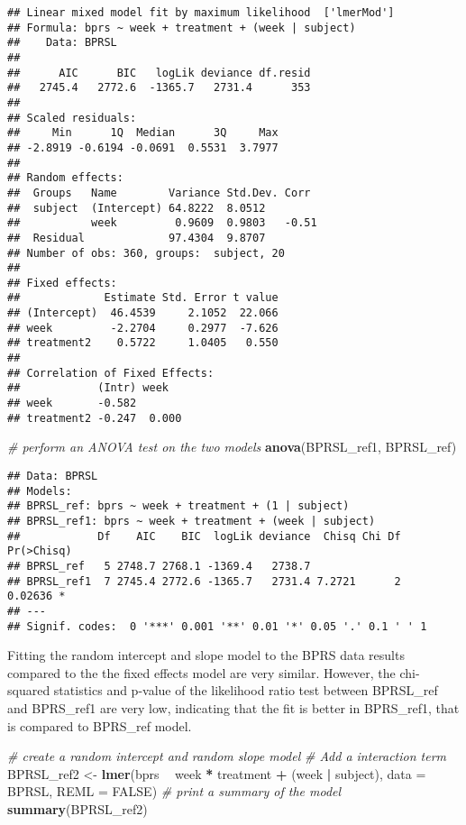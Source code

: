 \documentclass[]{article}
\newenvironment{Shaded}{\begin{snugshade}}{\end{snugshade}}
\newcommand{\CommentTok}[1]{\textcolor[rgb]{0.56,0.35,0.01}{\textit{#1}}}
\newcommand{\DataTypeTok}[1]{\textcolor[rgb]{0.13,0.29,0.53}{#1}}
\newcommand{\KeywordTok}[1]{\textcolor[rgb]{0.13,0.29,0.53}{\textbf{#1}}}
\newcommand{\NormalTok}[1]{#1}
\newcommand{\OperatorTok}[1]{\textcolor[rgb]{0.81,0.36,0.00}{\textbf{#1}}}
\newcommand{\OtherTok}[1]{\textcolor[rgb]{0.56,0.35,0.01}{#1}}
\newcommand{\StringTok}[1]{\textcolor[rgb]{0.31,0.60,0.02}{#1}}
\begin{document}
\begin{verbatim}
## Linear mixed model fit by maximum likelihood  ['lmerMod']
## Formula: bprs ~ week + treatment + (week | subject)
##    Data: BPRSL
## 
##      AIC      BIC   logLik deviance df.resid 
##   2745.4   2772.6  -1365.7   2731.4      353 
## 
## Scaled residuals: 
##     Min      1Q  Median      3Q     Max 
## -2.8919 -0.6194 -0.0691  0.5531  3.7977 
## 
## Random effects:
##  Groups   Name        Variance Std.Dev. Corr 
##  subject  (Intercept) 64.8222  8.0512        
##           week         0.9609  0.9803   -0.51
##  Residual             97.4304  9.8707        
## Number of obs: 360, groups:  subject, 20
## 
## Fixed effects:
##             Estimate Std. Error t value
## (Intercept)  46.4539     2.1052  22.066
## week         -2.2704     0.2977  -7.626
## treatment2    0.5722     1.0405   0.550
## 
## Correlation of Fixed Effects:
##            (Intr) week  
## week       -0.582       
## treatment2 -0.247  0.000
\end{verbatim}

\begin{Shaded}
\begin{Highlighting}[]
\CommentTok{# perform an ANOVA test on the two models}
\KeywordTok{anova}\NormalTok{(BPRSL_ref1, BPRSL_ref)}
\end{Highlighting}
\end{Shaded}

\begin{verbatim}
## Data: BPRSL
## Models:
## BPRSL_ref: bprs ~ week + treatment + (1 | subject)
## BPRSL_ref1: bprs ~ week + treatment + (week | subject)
##            Df    AIC    BIC  logLik deviance  Chisq Chi Df Pr(>Chisq)  
## BPRSL_ref   5 2748.7 2768.1 -1369.4   2738.7                           
## BPRSL_ref1  7 2745.4 2772.6 -1365.7   2731.4 7.2721      2    0.02636 *
## ---
## Signif. codes:  0 '***' 0.001 '**' 0.01 '*' 0.05 '.' 0.1 ' ' 1
\end{verbatim}

Fitting the random intercept and slope model to the BPRS data results
compared to the the fixed effects model are very similar. However, the
chi-squared statistics and p-value of the likelihood ratio test between
BPRSL\_ref and BPRS\_ref1 are very low, indicating that the fit is
better in BPRS\_ref1, that is compared to BPRS\_ref model.

\begin{Shaded}
\begin{Highlighting}[]
\CommentTok{# create a random intercept and random slope model}
\CommentTok{# Add a interaction term}
\NormalTok{BPRSL_ref2 <-}\StringTok{ }\KeywordTok{lmer}\NormalTok{(bprs }\OperatorTok{~}\StringTok{ }\NormalTok{week }\OperatorTok{*}\StringTok{ }\NormalTok{treatment }\OperatorTok{+}\StringTok{ }\NormalTok{(week }\OperatorTok{|}\StringTok{ }\NormalTok{subject), }\DataTypeTok{data =}\NormalTok{ BPRSL, }\DataTypeTok{REML =} \OtherTok{FALSE}\NormalTok{)}
\CommentTok{# print a summary of the model}
\KeywordTok{summary}\NormalTok{(BPRSL_ref2)}
\end{Highlighting}
\end{Shaded}
\end{document}
